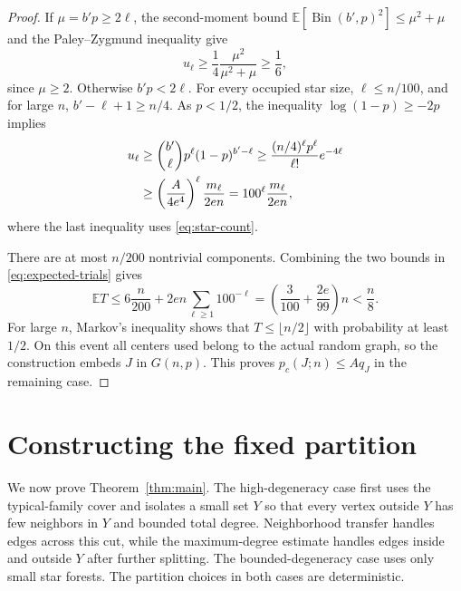 \documentclass[11pt]{article}
\theoremstyle{remark}
\numberwithin{equation}{section}
\newcommand{\E}{\mathbb E}
\DeclareMathOperator{\Bin}{Bin}
\begin{document}
\begin{proof}
If $\mu=b'p\geq2\ell$, the second-moment bound
$\E[\Bin(b',p)^2]\leq\mu^2+\mu$ and the Paley--Zygmund
inequality give
\[
 u_\ell\geq\frac14\frac{\mu^2}{\mu^2+\mu}\geq\frac16,
\]
since $\mu\geq2$. Otherwise $b'p<2\ell$. For every occupied
star size, $\ell\leq n/100$, and for large $n$,
$b'-\ell+1\geq n/4$. As $p<1/2$, the inequality
$\log(1-p)\geq-2p$ implies
\begin{align}
 u_\ell
 &\geq\binom{b'}{\ell}p^\ell(1-p)^{b'-\ell}
 \geq\frac{(n/4)^\ell p^\ell}{\ell!}e^{-4\ell}\notag\\
 &\geq\left(\frac{A}{4e^4}\right)^\ell
        \frac{m_\ell}{2e n}
 =100^\ell\frac{m_\ell}{2e n},
 \label{eq:star-small-mean}
\end{align}
where the last inequality uses \eqref{eq:star-count}.

There are at most $n/200$ nontrivial components. Combining
the two bounds in \eqref{eq:expected-trials} gives
\[
 \E T\leq6\frac{n}{200}+2e n\sum_{\ell\geq1}100^{-\ell}
 =\left(\frac3{100}+\frac{2e}{99}\right)n<\frac n8.
\]
For large $n$, Markov's inequality shows that
$T\leq\lfloor n/2\rfloor$ with probability at least $1/2$.
On this event all centers used belong to the actual random graph,
so the construction embeds $J$ in $G(n,p)$. This proves
$p_c(J;n)\leq Aq_J$ in the remaining case.
\end{proof}

\section{Constructing the fixed partition}
\label{sec:assembly}

We now prove Theorem~\ref{thm:main}. The high-degeneracy case
first uses the typical-family cover and isolates a small set $Y$
so that every vertex outside $Y$ has few neighbors in $Y$ and
bounded total degree. Neighborhood transfer handles edges across
this cut, while the maximum-degree estimate handles edges inside
and outside $Y$ after further splitting. The bounded-degeneracy
case uses only small star forests. The partition choices in both
cases are deterministic.
\end{document}
